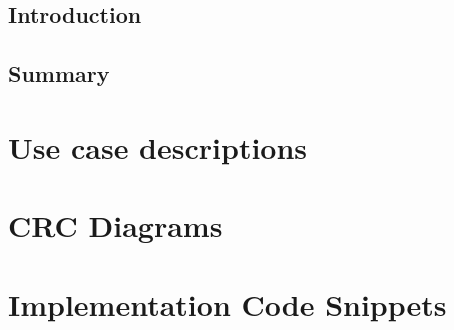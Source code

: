 \documentclass[11pt,oneside]{report}
\newcommand\code[1]{\texttt{#1}}
\begin{document}
	\section{Introduction}
	\section{Summary}
	\clearpage
	
	
	\begin{appendices}
	\chapter{Use case descriptions} \label{app:use_case_descriptions}
			
			
			
			
			
			
			
	\chapter{CRC Diagrams} \label{app:crc_diagrams}
			
			
			
			
	\chapter{Implementation Code Snippets}
			
	\end{appendices}
	
\end{document}
